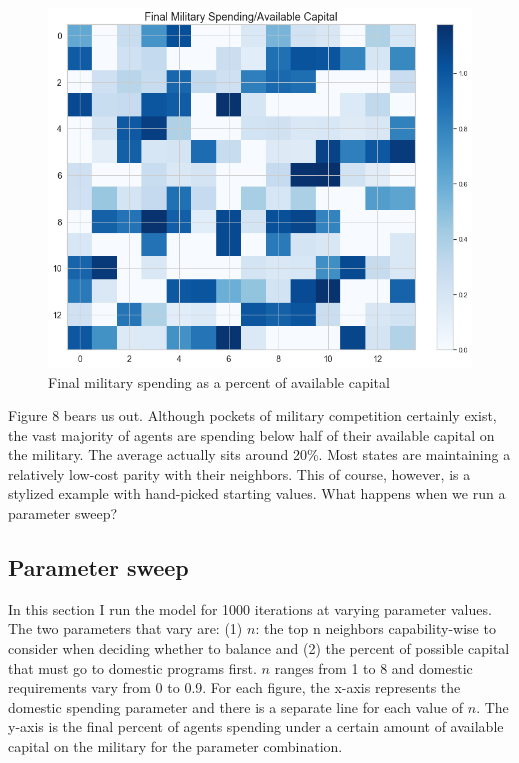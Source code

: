 \documentclass[12pt]{article}
\begin{document}
\begin{figure}[!ht]
    \centering
    \includegraphics[scale = 0.45]{images/final_mil_cap.png}
    \caption{Final military spending as a percent of available capital}
    \label{end_milcap}
\end{figure}

Figure 8 bears us out. Although pockets of military competition certainly exist, the vast majority of agents are spending below half of their available capital on the military. The average actually sits around 20\%. Most states are maintaining a relatively low-cost parity with their neighbors. This of course, however, is a stylized example with hand-picked starting values. What happens when we run a parameter sweep?

\subsection{Parameter sweep}

In this section I run the model for 1000 iterations at varying parameter values. The two parameters that vary are: (1) $n$: the top n neighbors capability-wise to consider when deciding whether to balance and (2) the percent of possible capital that must go to domestic programs first. $n$ ranges from 1 to 8 and domestic requirements vary from 0 to 0.9. For each figure, the x-axis represents the domestic spending parameter and there is a separate line for each value of $n$. The y-axis is the final percent of agents spending under a certain amount of available capital on the military for the parameter combination.
\end{document}
